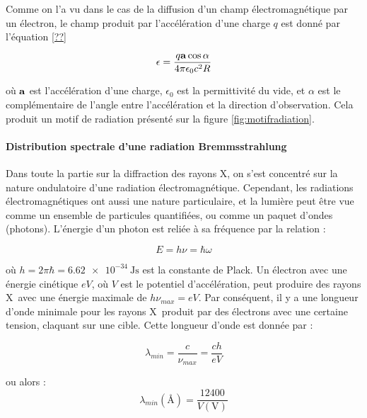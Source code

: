 Comme on l'a vu dans le cas de la diffusion d'un champ électromagnétique par un électron, le champ produit par l'accélération d'une charge $q$ est donné par l'équation \ref{??}

\begin{equation}
    \epsilon = \frac{q\mathbf{a}\cos\alpha}{4\pi \epsilon_0 c^2 R}
\end{equation}

où $\mathbf{a}$ est l'accélération d'une charge, $\epsilon_0$ est la permittivité du vide, et $\alpha$ est le complémentaire de l'angle entre l'accélération et la direction d'observation. Cela produit un motif de radiation présenté sur la figure \ref{fig:motifradiation}.

\begin{marginfigure}
    \TODO
    \caption{}
    \label{fig:motifradiation}
\end{marginfigure}

\paragraph{Distribution spectrale d'une radiation Bremmsstrahlung}

Dans toute la partie sur la diffraction des rayons X, on s'est concentré sur la nature ondulatoire d'une radiation électromagnétique. Cependant, les radiations électromagnétiques ont aussi une nature particulaire, et la lumière peut être vue comme un ensemble de particules quantifiées, ou comme un paquet d'ondes (photons). L'énergie d'un photon est reliée à sa fréquence par la relation :

\begin{equation}
    E = h \nu = \hbar \omega
\end{equation}

où $h = 2\pi \hbar = \SI{6.62e-34}{\joule\second}$ est la constante de Plack. Un électron avec une énergie cinétique $eV$, où $V$ est le potentiel d'accélération, peut produire des rayons X avec une énergie maximale de $h\nu_{max} = eV$. Par conséquent, il y a une longueur d'onde minimale pour les rayons X produit par des électrons avec une certaine tension, claquant sur une cible. Cette longueur d'onde est donnée par :

\begin{equation}
    \lambda_{min} = \frac{c}{\nu_{max}} = \frac{ch}{eV}
\end{equation}

ou alors :
\begin{equation}
    \lambda_{min} (\si{\angstrom}) = \frac{12400}{V(\si{\volt})}
\end{equation}

